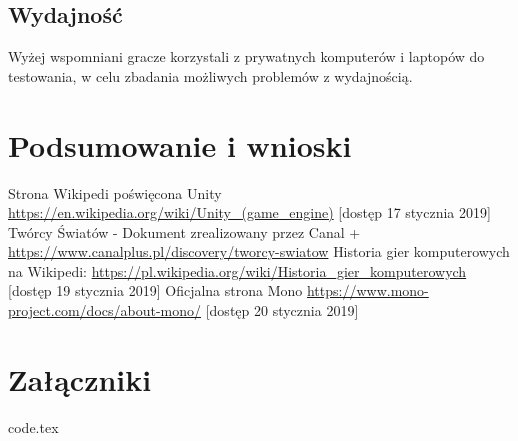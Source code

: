 \documentclass[a4paper,12pt,twoside,openany]{report}
\begin{document}
\section{Wydajność}
Wyżej wspomniani gracze korzystali z prywatnych komputerów i laptopów do testowania, w celu zbadania możliwych problemów z wydajnością. 

\chapter{Podsumowanie i wnioski }


\begin{thebibliography}{99}
 {Strona Wikipedi poświęcona Unity  \url{https://en.wikipedia.org/wiki/Unity_(game_engine)} [dostęp 17 stycznia 2019]}
 {Twórcy Światów - Dokument zrealizowany przez Canal + \url{https://www.canalplus.pl/discovery/tworcy-swiatow}}
 {Historia gier komputerowych na Wikipedi: \url{https://pl.wikipedia.org/wiki/Historia_gier_komputerowych} [dostęp 19 stycznia 2019]}
 {Oficjalna strona Mono \url{https://www.mono-project.com/docs/about-mono/} [dostęp 20 stycznia 2019]}

\end{thebibliography}

\listoffigures
 
\listoftables

\appendix
\chapter{Załączniki}
     {code.tex}

\end{document}
